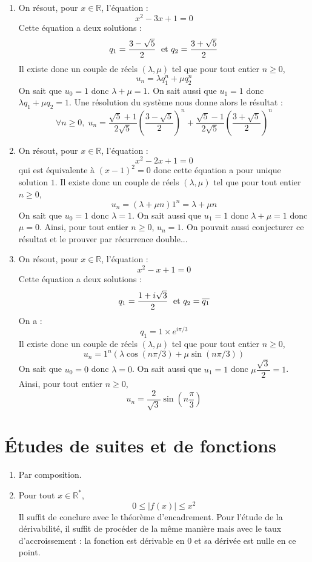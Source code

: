\documentclass[a4paper,twoside,french,11pt]{VcCours}
\begin{document}
\begin{Exercice}{}\end{Exercice}

\begin{enumerate}
\item On résout, pour $x \in \mathbb{R}$, l'équation :
$$ x^2-3x+1=0$$
Cette équation a deux solutions :
$$ q_1 = \frac{3-\sqrt{5}}{2}  \; \hbox{ et } q_2 = \frac{3+\sqrt{5}}{2}$$
Il existe donc un couple de réels $(\lambda, \mu)$ tel que pour tout entier $n \geq 0$,
$$ u_n = \lambda q_1^n + \mu q_2^n$$
On sait que $u_0=1$ donc $\lambda+\mu=1$. On sait aussi que $u_1=1$ donc $\lambda q_1+ \mu q_2=1$. Une résolution du système nous donne alors le résultat :
$$\forall n \geq 0, \; u_n =   \frac{\sqrt{5}+1}{2 \sqrt{5}} \left( \frac{3-\sqrt{5}}{2} \right)^n + \frac{\sqrt{5}-1}{2 \sqrt{5}} \left( \frac{3+ \sqrt{5}}{2} \right)^n$$
\item On résout, pour $x \in \mathbb{R}$, l'équation :
$$ x^2-2x+1=0$$
qui est équivalente à $(x-1)^2=0$ donc cette équation a pour unique solution $1$. Il existe donc un couple de réels $(\lambda, \mu)$ tel que pour tout entier $n \geq 0$,
$$ u_n = (\lambda+ \mu n) 1^n = \lambda + \mu n$$
On sait que $u_0=1$ donc $\lambda=1$. On sait aussi que $u_1=1$ donc $\lambda+ \mu =1$ donc $\mu =0$. Ainsi, pour tout entier $n \geq 0$, $u_n=1$. On pouvait aussi conjecturer ce résultat et le prouver par récurrence double...
\item On résout, pour $x \in \mathbb{R}$, l'équation :
$$ x^2-x+1=0$$
Cette équation a deux solutions :
$$ q_1 = \frac{1+i\sqrt{3}}{2}  \; \hbox{ et } q_2 = \overline{q_1}$$
On a :
$$ q_1 = 1 \times e^{i \pi/3}$$
Il existe donc un couple de réels $(\lambda, \mu)$ tel que pour tout entier $n \geq 0$,
$$ u_n = 1^n (\lambda \cos(n \pi/3) + \mu \sin(n \pi/3))$$
On sait que $u_0=0$ donc $\lambda=0$. On sait aussi que $u_1=1$ donc $\mu \dfrac{\sqrt{3}}{2}  =1$. Ainsi, pour tout entier $n \geq 0$,
$$u_n =   \frac{2}{\sqrt{3}} \sin \left( n \frac{\pi}{3} \right) $$
\end{enumerate}

\section{Études de suites et de fonctions}

\begin{Exercice}{}\end{Exercice}

\begin{enumerate}
\item Par composition.
\item Pour tout $x \in \mathbb{R}^*$,
$$ 0 \leq \vert f(x) \vert \leq x^2$$
Il suffit de conclure avec le théorème d'encadrement. Pour l'étude de la dérivabilité, il suffit de procéder de la même manière mais avec le taux d'accroissement : la fonction est dérivable en $0$ et sa dérivée est nulle en ce point.
\end{enumerate}
\end{document}
